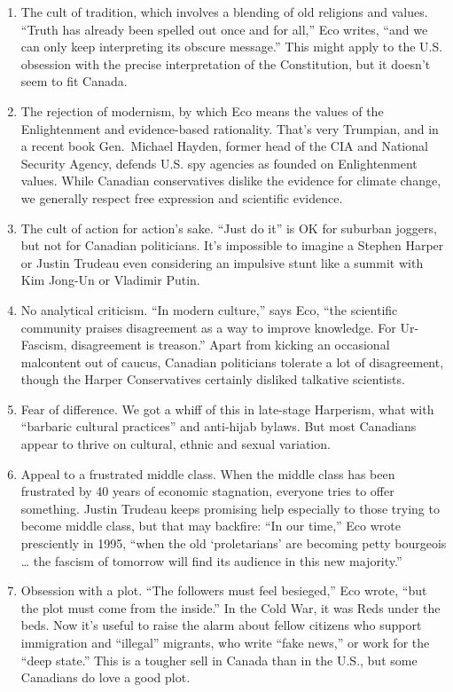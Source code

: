 \documentclass[
]{book}
\begin{document}
\begin{enumerate}
\def\labelenumi{\arabic{enumi}.}
\item
  The cult of tradition, which involves a blending of old religions and values. ``Truth has already been spelled out once and for all,'' Eco writes, ``and we can only keep interpreting its obscure message.'' This might apply to the U.S. obsession with the precise interpretation of the Constitution, but it doesn't seem to fit Canada.
\item
  The rejection of modernism, by which Eco means the values of the Enlightenment and evidence-based rationality. That's very Trumpian, and in a recent book Gen.~Michael Hayden, former head of the CIA and National Security Agency, defends U.S. spy agencies as founded on Enlightenment values. While Canadian conservatives dislike the evidence for climate change, we generally respect free expression and scientific evidence.
\item
  The cult of action for action's sake. ``Just do it'' is OK for suburban joggers, but not for Canadian politicians. It's impossible to imagine a Stephen Harper or Justin Trudeau even considering an impulsive stunt like a summit with Kim Jong-Un or Vladimir Putin.
\item
  No analytical criticism. ``In modern culture,'' says Eco, ``the scientific community praises disagreement as a way to improve knowledge. For Ur-Fascism, disagreement is treason.'' Apart from kicking an occasional malcontent out of caucus, Canadian politicians tolerate a lot of disagreement, though the Harper Conservatives certainly disliked talkative scientists.
\item
  Fear of difference. We got a whiff of this in late-stage Harperism, what with ``barbaric cultural practices'' and anti-hijab bylaws. But most Canadians appear to thrive on cultural, ethnic and sexual variation.
\item
  Appeal to a frustrated middle class. When the middle class has been frustrated by 40 years of economic stagnation, everyone tries to offer something. Justin Trudeau keeps promising help especially to those trying to become middle class, but that may backfire: ``In our time,'' Eco wrote presciently in 1995, ``when the old `proletarians' are becoming petty bourgeois \ldots{} the fascism of tomorrow will find its audience in this new majority.''
\item
  Obsession with a plot. ``The followers must feel besieged,'' Eco wrote, ``but the plot must come from the inside.'' In the Cold War, it was Reds under the beds. Now it's useful to raise the alarm about fellow citizens who support immigration and ``illegal'' migrants, who write ``fake news,'' or work for the ``deep state.'' This is a tougher sell in Canada than in the U.S., but some Canadians do love a good plot.

\end{enumerate}
\end{document}
